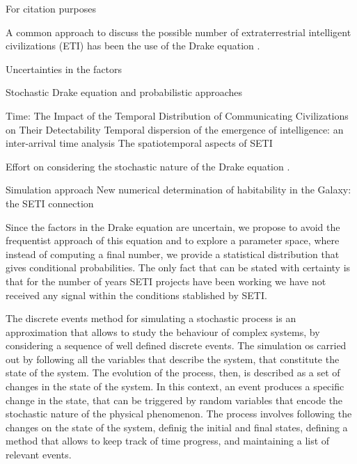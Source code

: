 \documentclass[useAMS,usenatbib]{mnras}
\begin{document}
For citation purposes \citep{cirkovic_temporal_2004}










A common approach to discuss the possible number of extraterrestrial
intelligent civilizations (ETI) has been the use of the Drake equation
\citep{}.

Uncertainties in the factors

Stochastic Drake equation and probabilistic approaches


Time:
The Impact of the Temporal Distribution of Communicating Civilizations on Their Detectability
Temporal dispersion of the emergence of intelligence: an inter-arrival time analysis
The spatiotemporal aspects of SETI
\citep{Fogg1987, Forgan2011, Balb2018}


Effort on considering the stochastic nature of the Drake equation
\citep{Glade2011}.


Simulation approach
New numerical determination of habitability in the Galaxy: the SETI connection
\citep{Forgan2008, Forgan2010}



Since the factors in the Drake equation are uncertain, we propose to
avoid the frequentist approach of this equation
and to explore a parameter space, where instead of computing a final
number, we provide a statistical distribution that gives conditional
probabilities.
%
The only fact that can be stated with certainty is that for the number
of years SETI projects have been working we have not received any
signal within the conditions stablished by SETI.



The discrete events method for simulating a stochastic process is an
approximation that allows to study the behaviour of complex
systems, by considering a sequence of well defined discrete events.
%
The simulation os carried out by following all the variables that
describe the system, that constitute the state of the system.
%
The evolution of the process, then, is described as a set of changes
in the state of the system.
%
In this context, an event produces a specific change in the state,
that can be triggered by random variables that encode the stochastic
nature of the physical phenomenon.
%
The process involves following the changes on the state of the system,
definig the initial and final states, defining a method that allows to
keep track of time progress, and maintaining a list of relevant
events.
\end{document}
